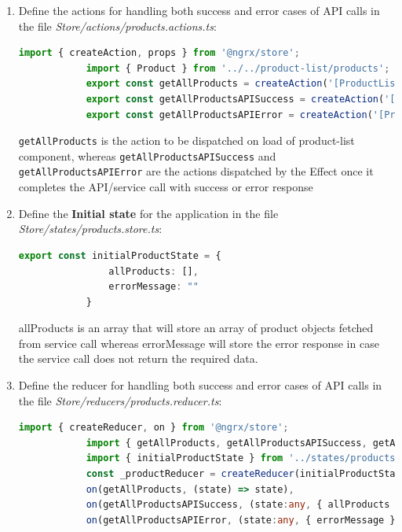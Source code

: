 \documentclass{report}
\begin{document}
\begin{enumerate}
\item{Define the actions for handling both success and error cases of API calls in the file \textit{Store/actions/products.actions.ts}:}
		\begin{lstlisting}[language=Typescript, caption=Store/actions/products.actions.ts]
			import { createAction, props } from '@ngrx/store';
			import { Product } from '../../product-list/products';
			export const getAllProducts = createAction('[ProductList Component] GET_ALL_PRODUCTS')
			export const getAllProductsAPISuccess = createAction('[ProductList Component] GET_ALL_PRODUCTS SUCCESS', props<{ allProducts: Product[] }>())
			export const getAllProductsAPIError = createAction('[ProductList Component] GET_ALL_PRODUCTS ERROR', props<{ errorMessage: String }>())
		\end{lstlisting}	
	\lstinline{getAllProducts} is the action to be dispatched on load of product-list component, whereas \lstinline{getAllProductsAPISuccess} and \lstinline{getAllProductsAPIError} are the actions dispatched by the Effect once it completes the API/service call with success or error response
\item{Define the \textbf{Initial state} for the application in the file \textit{Store/states/products.store.ts}:}
		\begin{lstlisting}[caption=Store/states/products.store.ts, language=Typescript]
			export const initialProductState = {
				allProducts: [],
				errorMessage: ""
			}
\end{lstlisting}
allProducts is an array that will store an array of product objects fetched from service call whereas errorMessage will store the error response in case the service call does not return the required data.
\item{Define the reducer for handling both success and error cases of API calls in the file \textit{Store/reducers/products.reducer.ts}:}
		\begin{lstlisting}[language=Typescript, caption=Store/reducers/products.reducer.ts]
			import { createReducer, on } from '@ngrx/store';
			import { getAllProducts, getAllProductsAPISuccess, getAllProductsAPIError } from '../actions/products.actions';
			import { initialProductState } from '../states/products.store';
			const _productReducer = createReducer(initialProductState,
			on(getAllProducts, (state) => state),
			on(getAllProductsAPISuccess, (state:any, { allProducts }) => { return { ...state, allProducts: allProducts, errorMessage: "" } }),
			on(getAllProductsAPIError, (state:any, { errorMessage }) => { return { ...state, errorMessage: errorMessage, allProducts: [] } })

\end{lstlisting}
\end{enumerate}
\end{document}
